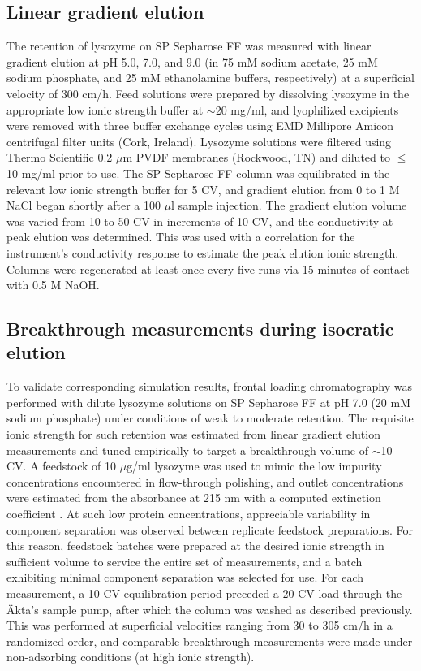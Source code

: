 \documentclass[preprint,review,12pt]{elsarticle}
\begin{document}
    \subsection{Linear gradient elution} \label{ssec:lge}
        The retention of lysozyme on SP Sepharose FF was measured with linear gradient elution at pH 5.0, 7.0, and 9.0 (in 75 mM sodium acetate, 25 mM sodium phosphate, and 25 mM ethanolamine buffers, respectively) at a superficial velocity of 300 cm/h. Feed solutions were prepared by dissolving lysozyme in the appropriate low ionic strength buffer at $\sim$20 mg/ml, and lyophilized excipients were removed with three buffer exchange cycles using EMD Millipore Amicon centrifugal filter units (Cork, Ireland). Lysozyme solutions were filtered using Thermo Scientific 0.2 $\mu$m PVDF membranes (Rockwood, TN) and diluted to $\leq$ 10 mg/ml prior to use. The SP Sepharose FF column was equilibrated in the relevant low ionic strength buffer for 5 CV, and gradient elution from 0 to 1 M NaCl began shortly after a 100 $\mu$l sample injection. The gradient elution volume was varied from 10 to 50 CV in increments of 10 CV, and the conductivity at peak elution was determined. This was used with a correlation for the instrument's conductivity response to estimate the peak elution ionic strength. Columns were regenerated at least once every five runs via 15 minutes of contact with 0.5 M NaOH.

    \subsection{Breakthrough measurements during isocratic elution} \label{ssec:exp_breakthrough}
        To validate corresponding simulation results, frontal loading chromatography was performed with dilute lysozyme solutions on SP Sepharose FF at pH 7.0 (20 mM sodium phosphate) under conditions of weak to moderate retention. The requisite ionic strength for such retention was estimated from linear gradient elution measurements and tuned empirically to target a breakthrough volume of $\sim$10 CV. A feedstock of 10 $\mu$g/ml lysozyme was used to mimic the low impurity concentrations encountered in flow-through polishing, and outlet concentrations were estimated from the absorbance at 215 nm with a computed extinction coefficient \cite{Kuipers2007}. At such low protein concentrations, appreciable variability in component separation was observed between replicate feedstock preparations. For this reason, feedstock batches were  prepared at the desired ionic strength in sufficient volume to service the entire set of measurements, and a batch exhibiting minimal component separation was selected for use. For each measurement, a 10 CV equilibration period preceded a 20 CV load through the \"{A}kta's sample pump, after which the column was washed as described previously. This was performed at superficial velocities ranging from 30 to 305 cm/h in a randomized order, and comparable breakthrough measurements were made under non-adsorbing conditions (at high ionic strength).
\end{document}
